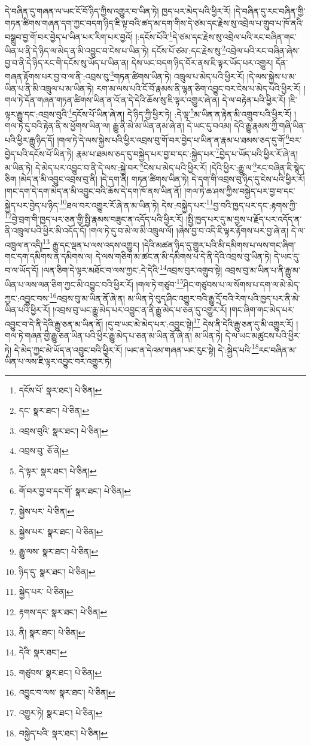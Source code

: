 དེ་བཞིན་དུ་གཞན་ལ་ཡང་ངོ་བོ་ཉིད་ཀྱིས་འགྱུར་བ་ཡིན་ཏེ། ཁྱད་པར་མེད་པའི་ཕྱིར་རོ། །དེ་བཞིན་དུ་རང་བཞིན་གྱི་གཏན་ཚིགས་གཞན་དག་ཀྱང་བདག་ཉིད་ཇི་ལྟ་བའི་ཚད་མ་དག་གིས་དེ་ཙམ་དང་རྗེས་སུ་འབྲེལ་པ་གྲུབ་པ་ཁོ་ནའི་བསྒྲུབ་བྱ་གོ་བར་བྱེད་པ་ཡིན་པར་རིག་པར་བྱའོ། །:དངོས་པོའི་\footnote{དངོས་པོ་  སྣར་ཐང་།  པེ་ཅིན། }དེ་ཙམ་དང་རྗེས་སུ་འབྲེལ་པའི་རང་བཞིན་གང་ཡིན་པ་ནི་དེ་ཉིད་ལ་མེད་ན་མི་འབྱུང་བ་ངེས་པ་ཡིན་ཏེ། དངོས་པོ་ཙམ་:དང་རྗེས་སུ་\footnote{དང་  སྣར་ཐང་།  པེ་ཅིན། }འབྲེལ་པའི་རང་བཞིན་ཞེས་བྱ་བ་ནི་དེ་ཉིད་རང་གི་དངོས་སུ་ཡོད་པ་ཡིན་ན། དེས་ཡང་བདག་ཉིད་བོར་ནས་ཇི་ལྟར་ཡོད་པར་འགྱུར། དོན་གཞན་རྟོགས་པར་བྱ་བ་ལ་ནི་:འབྲས་བུ་\footnote{འབྲས་བུའི་  སྣར་ཐང་།  པེ་ཅིན། }གཏན་ཚིགས་ཡིན་ཏེ། འཁྲུལ་པ་མེད་པའི་ཕྱིར་རོ། །དེ་ལས་སྐྱེས་པ་མ་ཡིན་པ་ནི་མི་འཁྲུལ་པ་མ་ཡིན་ཏེ། རག་མ་ལས་པའི་ངོ་བོ་རྣམས་ནི་ལྷན་ཅིག་འབྱུང་བར་ངེས་པ་མེད་པའི་ཕྱིར་རོ། །གལ་ཏེ་དོན་གཞན་གཏན་ཚིགས་ཡིན་ན་འོ་ན་དེ་དེའི་ཆོས་སུ་ཇི་ལྟར་འགྱུར་ཞེ་ན། དེ་ལ་བརྟེན་པའི་ཕྱིར་རོ། །ཇི་ལྟར་རྒྱུ་དང་:འབྲས་བུའི་\footnote{འབྲས་བུ་  ཅོ་ནེ། }དངོས་པོ་ཡིན་ཞེ་ན། དེ་ཉིད་ཀྱི་ཕྱིར་ཏེ། :དེ་ལྟ་\footnote{དེ་ལྟར་  སྣར་ཐང་།  པེ་ཅིན། }མ་ཡིན་ན་རྟེན་མི་འགྲུབ་པའི་ཕྱིར་རོ། །གལ་ཏེ་དུ་བའི་རྟེན་ནི་ས་ཕྱོགས་ཡིན་ལ། རྒྱུ་ནི་མེ་མ་ཡིན་ནམ་ཞེ་ན། དེ་ཡང་དུ་བའམ། དེའི་རྒྱུ་རྣམས་ཀྱི་གཞི་ཡིན་པའི་ཕྱིར་རྒྱུ་ཉིད་དོ། །གལ་ཏེ་དེ་ལས་སྐྱེས་པའི་ཕྱིར་འབྲས་བུ་གོ་བར་བྱེད་པ་ཡིན་ན་རྣམ་པ་ཐམས་ཅད་དུ་གོ་\footnote{གོ་བར་བྱ་བ་དང་གོ་  སྣར་ཐང་།  པེ་ཅིན། }བར་བྱེད་པའི་དངོས་པོ་ཡིན་ཏེ། རྣམ་པ་ཐམས་ཅད་དུ་བསྐྱེད་པར་བྱ་བ་དང་:སྐྱེད་པར་\footnote{སྐྱེས་པར་  པེ་ཅིན། }བྱེད་པ་ཡོད་པའི་ཕྱིར་རོ་ཞེ་ན། མ་ཡིན་ཏེ། དེ་མེད་པར་འབྱུང་བ་ནི་དེ་ལས་:སྐྱེ་བར་\footnote{སྐྱེས་པར་  སྣར་ཐང་།  པེ་ཅིན། }ངེས་པ་མེད་པའི་ཕྱིར་རོ། །དེའི་ཕྱིར་:རྒྱུ་ལ་\footnote{རྒྱུ་ལས་  སྣར་ཐང་།  པེ་ཅིན། }རང་བཞིན་ཇི་སྙེད་ཅིག །མེད་ན་མི་འབྱུང་འབྲས་བུ་ནི། །དེ་དག་ནི། གཏན་ཚིགས་ཡིན་ཏེ། དེ་དག་གི་འབྲས་བུ་ཉིད་དུ་ངེས་པའི་ཕྱིར་རོ། །གང་དག་དེ་དག་མེད་ན་མི་འབྱུང་བའི་ཆོས་དེ་དག་ཁོ་ནས་ཡིན་ནོ། །གལ་ཏེ་ཆ་ཤས་ཀྱིས་བསྐྱེད་པར་བྱ་བ་དང་སྐྱེད་པར་བྱེད་པ་ཉིད་\footnote{ཉིད་དུ་  སྣར་ཐང་།  པེ་ཅིན། }ཐལ་བར་འགྱུར་རོ་ཞེ་ན་མ་ཡིན་ཏེ། དེས་:བསྐྱེད་པར་\footnote{སྐྱེད་པར་  པེ་ཅིན། }བྱ་བའི་ཁྱད་པར་དང་:རྟགས་ཀྱི་\footnote{རྟགས་དང་  སྣར་ཐང་།  པེ་ཅིན། }བྱེ་བྲག་གི་ཁྱད་པར་ཅན་གྱི་སྤྱི་རྣམས་བཟུང་ན་འདོད་པའི་ཕྱིར་རོ། །སྤྱི་ཁྱད་པར་དུ་མ་བྱས་པ་རྗོད་པར་འདོད་ན་ནི་འཁྲུལ་པའི་ཕྱིར་མི་འདོད་དོ། །གལ་ཏེ་དུ་བ་མེ་ལ་མི་འཁྲུལ་ལོ། །ཞེས་བྱ་བ་འདི་ཇི་ལྟར་རྟོགས་པར་བྱ་ཞེ་ན། དེ་ལ་འཁྲུལ་ན་འདི།\footnote{ནི།  སྣར་ཐང་།  པེ་ཅིན། } རྒྱུ་དང་ལྡན་པ་ལས་འདས་འགྱུར། །དེའི་མཚན་ཉིད་དུ་གྱུར་པའི་མི་དམིགས་པ་ལས་གང་ཞིག་གང་དག་དམིགས་ན་དམིགས་ལ། དེ་ལས་གཅིག་མ་ཚང་ན་མི་དམིགས་པ་དེ་ནི་དེའི་འབྲས་བུ་ཡིན་ཏེ། དེ་ཡང་དུ་བ་ལ་ཡོད་དོ། །ལན་ཅིག་དེ་ལྟར་མཐོང་བ་ལས་ཀྱང་:དེ་དེའི་\footnote{དེའི་  སྣར་ཐང་། }འབྲས་བུར་འགྲུབ་སྟེ། འབྲས་བུ་མ་ཡིན་པ་ནི་རྒྱུ་མ་ཡིན་པ་ལས་ལན་ཅིག་ཀྱང་མི་འབྱུང་བའི་ཕྱིར་རོ། །གལ་ཏེ་གཙུབ་\footnote{གཙུབས་  སྣར་ཐང་།  པེ་ཅིན། }ཤིང་གཙུབས་པ་ལ་སོགས་པ་དག་ལ་མེ་མེད་ཀྱང་:འབྱུང་བས་\footnote{འབྱུང་བ་ལས་  སྣར་ཐང་།  པེ་ཅིན། }འབྲས་བུ་མ་ཡིན་ནོ་ཞེ་ན། མ་ཡིན་ཏེ་བུད་ཤིང་འགྱུར་བའི་རྒྱུ་དྲོ་བའི་རེག་པའི་ཁྱད་པར་ནི་མེ་ཡིན་པའི་ཕྱིར་རོ། །འབྲས་བུ་ཡང་རྒྱུ་མེད་པར་འབྱུང་ན་ནི་རྒྱུ་མེད་པ་ཅན་དུ་འགྱུར་རོ། །གང་ཞིག་གང་མེད་པར་འབྱུང་བ་དེ་ནི་དེའི་རྒྱུ་ཅན་མ་ཡིན་ནོ། །དུ་བ་ཡང་མེ་མེད་པར་:འབྱུང་སྟེ།\footnote{འགྱུར་ཏེ།  སྣར་ཐང་།  པེ་ཅིན། } དེས་ནི་དེའི་རྒྱུ་ཅན་དུ་མི་འགྱུར་རོ། །གལ་ཏེ་གཞན་གྱི་རྒྱུ་ཅན་ཡིན་པའི་ཕྱིར་རྒྱུ་མེད་པ་ཅན་མ་ཡིན་ནོ་ཞེ་ན། མ་ཡིན་ཏེ། དེ་ལ་ཡང་མཚུངས་པའི་ཕྱིར་ཏེ། དེ་མེད་ཀྱང་མེ་ཡོད་ན་འབྱུང་བའི་ཕྱིར་རོ། །ཡང་ན་དེའམ་གཞན་ཡང་རུང་སྟེ། དེ་:སྐྱེད་པའི་\footnote{བསྐྱེད་པའི་  སྣར་ཐང་།  པེ་ཅིན། }རང་བཞིན་མ་ཡིན་པ་ལས་ཇི་ལྟར་འབྱུང་བར་འགྱུར་ཏེ། 